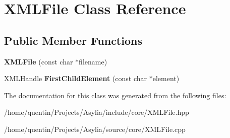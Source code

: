 \hypertarget{classXMLFile}{\section{X\-M\-L\-File Class Reference}
\label{classXMLFile}
}
\subsection*{Public Member Functions}
\begin{DoxyCompactItemize}
\item 
\hypertarget{classXMLFile_a3f6ee539d05eace7843006da01e33e53}{{\bfseries X\-M\-L\-File} (const char $\ast$filename)}\label{classXMLFile_a3f6ee539d05eace7843006da01e33e53}

\item 
\hypertarget{classXMLFile_adc30aaf5a1cecc72ed8846d0907b48e6}{X\-M\-L\-Handle {\bfseries First\-Child\-Element} (const char $\ast$element)}\label{classXMLFile_adc30aaf5a1cecc72ed8846d0907b48e6}

\end{DoxyCompactItemize}


The documentation for this class was generated from the following files\-:\begin{DoxyCompactItemize}
\item 
/home/quentin/\-Projects/\-Asylia/include/core/X\-M\-L\-File.\-hpp\item 
/home/quentin/\-Projects/\-Asylia/source/core/X\-M\-L\-File.\-cpp\end{DoxyCompactItemize}
